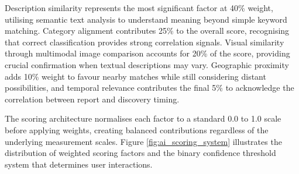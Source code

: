 Description similarity represents the most significant factor at 40\% weight, utilising semantic text analysis to understand meaning beyond simple keyword matching. Category alignment contributes 25\% to the overall score, recognising that correct classification provides strong correlation signals. Visual similarity through multimodal image comparison accounts for 20\% of the score, providing crucial confirmation when textual descriptions may vary. Geographic proximity adds 10\% weight to favour nearby matches while still considering distant possibilities, and temporal relevance contributes the final 5\% to acknowledge the correlation between report and discovery timing.

The scoring architecture normalises each factor to a standard 0.0 to 1.0 scale before applying weights, creating balanced contributions regardless of the underlying measurement scales. Figure \ref{fig:ai_scoring_system} illustrates the distribution of weighted scoring factors and the binary confidence threshold system that determines user interactions.

